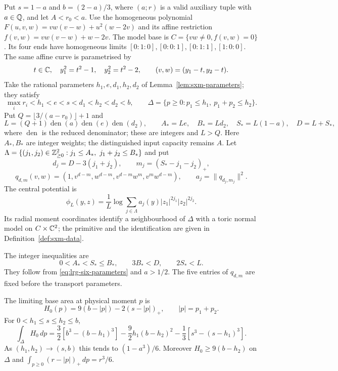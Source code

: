 \begin{definition}\label{def:lrg-six-model}
Put $s=1-a$ and $b=(2-a)/3$, where $(a;r)$ is a valid auxiliary tuple with $a\in\mathbb{Q}$, and let $A<r_0<a$.
Use the homogeneous polynomial $F(u,v,w)=vw(v-w)+u^2(w-2v)$ and its affine restriction
$f(v,w)=vw(v-w)+w-2v$. The model base is $C=\{vw\ne0,f(v,w)=0\}$. Its four ends have homogeneous limits
$[0:1:0],[0:0:1],[0:1:1],[1:0:0]$.
The same affine curve is parametrised by
\[
 t\in\mathbb{C},\quad y_1^2=t^2-1,\quad y_2^2=t^2-2,
 \qquad (v,w)=(y_1-t,y_2-t).
\]
Take the rational parameters $h_1,e,d_1,h_2,d_2$ of Lemma~\ref{lem:sxm-parameters}; they satisfy
\begin{equation}\label{eq:lrg-six-parameters}
 \max_i r_i<h_1<e<s<d_1<h_2<d_2<b,
 \qquad \Delta=\{p\ge0:p_1\le h_1,\ p_1+p_2\le h_2\}.
\end{equation}
Put $Q=\lfloor3/(a-r_0)\rfloor+1$ and
\[
 L=(Q+1)\operatorname{den}(a)\operatorname{den}(e)\operatorname{den}(d_2),\qquad
 A_*=Le,\quad B_*=Ld_2,\quad S_*=L(1-a),\quad D=L+S_*,
\]
where $\operatorname{den}$ is the reduced denominator; these are integers and $L>Q$.
Here $A_*,B_*$ are integer weights; the distinguished input capacity remains $A$.
Let $\Lambda=\{(j_1,j_2)\in\mathbb{Z}_{\ge0}^2:j_1\le A_*,\ j_1+j_2\le B_*\}$ and put
\[
 d_j=D-3(j_1+j_2),\qquad m_j=(S_*-j_1-j_2)_+,
\]
\[
 q_{d,m}(v,w)=(1,v^{d-m},w^{d-m},v^{d-m}w^m,v^mw^{d-m}),
 \qquad a_j=\|q_{d_j,m_j}\|^2.
\]
The central potential is
\begin{equation}\label{eq:lrg-six-potential}
 \phi_L(y,z)=\frac1L\log\sum_{j\in\Lambda}a_j(y)|z_1|^{2j_1}|z_2|^{2j_2}.
\end{equation}
Its radial moment coordinates identify a neighbourhood of $\Delta$ with a toric normal model
on $C\times\mathbb{C}^2$; the primitive and the identification are given in
Definition~\ref{def:sxm-data}.
\end{definition}

The integer inequalities are
\[
 0<A_*<S_*\le B_*,\qquad 3B_*<D,\qquad 2S_*<L.
\]
They follow from \eqref{eq:lrg-six-parameters} and $a>1/2$.
The five entries of $q_{d,m}$ are fixed before the transport parameters.

\begin{lemma}\label{lem:lrg-six-profile}
The limiting base area at physical moment $p$ is
\[
 H_0(p)=9(b-|p|)-2(s-|p|)_+,\qquad |p|=p_1+p_2.
\]
For $0<h_1\le s\le h_2\le b$,
\[
 \int_\Delta H_0\,dp=
 \frac32[b^3-(b-h_1)^3]-\frac92h_1(b-h_2)^2
 -\frac13[s^3-(s-h_1)^3].
\]
As $(h_1,h_2)\to(s,b)$ this tends to $(1-a^3)/6$.
Moreover $H_0\ge9(b-h_2)$ on $\Delta$ and
$\int_{p\ge0}(r-|p|)_+\,dp=r^3/6$.
\end{lemma}

